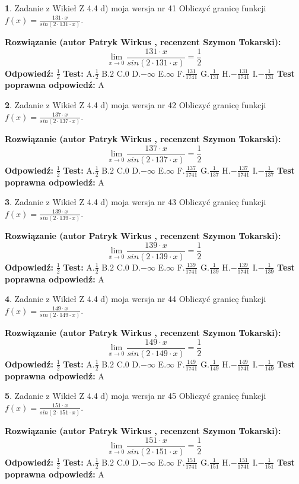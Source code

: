 \documentclass[12pt, a4paper]{article}
\theoremstyle{definition} %
\newtheorem{zad}{}
\newcommand{\zadStart}[1]{\begin{zad}#1\newline}
\newcommand{\zadStop}{\end{zad}}
\newcommand{\rozwStart}[2]{\noindent \textbf{Rozwiązanie (autor #1 , recenzent #2): }\newline}
\newcommand{\rozwStop}{\newline}
\newcommand{\odpStart}{\noindent \textbf{Odpowiedź:}\newline}
\newcommand{\odpStop}{\newline}
\newcommand{\testStart}{\noindent \textbf{Test:}\newline}
\newcommand{\testStop}{\newline}
\newcommand{\kluczStart}{\noindent \textbf{Test poprawna odpowiedź:}\newline}
\newcommand{\kluczStop}{\newline}
\begin{document}
\zadStart{Zadanie z Wikieł Z 4.4 d) moja wersja nr 41}
Obliczyć granicę funkcji $f(x)=\frac{131\cdot x}{sin(2 \cdot131\cdot x)}$.
\zadStop
\rozwStart{Patryk Wirkus}{Szymon Tokarski}
$$\lim\limits_{x\to 0}\frac{131\cdot x}{sin(2 \cdot131\cdot x)}=\frac{1}{2}$$
\rozwStop
\odpStart
$\frac{1}{2}$
\odpStop
\testStart
A.$\frac{1}{2}$
B.$2$
C.$0$
D.$-\infty$
E.$\infty$
F.$\frac{131}{1741}$
G.$\frac{1}{131}$
H.$-\frac{131}{1741}$
I.$-\frac{1}{131}$
\testStop
\kluczStart
A
\kluczStop



\zadStart{Zadanie z Wikieł Z 4.4 d) moja wersja nr 42}
Obliczyć granicę funkcji $f(x)=\frac{137\cdot x}{sin(2 \cdot137\cdot x)}$.
\zadStop
\rozwStart{Patryk Wirkus}{Szymon Tokarski}
$$\lim\limits_{x\to 0}\frac{137\cdot x}{sin(2 \cdot137\cdot x)}=\frac{1}{2}$$
\rozwStop
\odpStart
$\frac{1}{2}$
\odpStop
\testStart
A.$\frac{1}{2}$
B.$2$
C.$0$
D.$-\infty$
E.$\infty$
F.$\frac{137}{1741}$
G.$\frac{1}{137}$
H.$-\frac{137}{1741}$
I.$-\frac{1}{137}$
\testStop
\kluczStart
A
\kluczStop



\zadStart{Zadanie z Wikieł Z 4.4 d) moja wersja nr 43}
Obliczyć granicę funkcji $f(x)=\frac{139\cdot x}{sin(2 \cdot139\cdot x)}$.
\zadStop
\rozwStart{Patryk Wirkus}{Szymon Tokarski}
$$\lim\limits_{x\to 0}\frac{139\cdot x}{sin(2 \cdot139\cdot x)}=\frac{1}{2}$$
\rozwStop
\odpStart
$\frac{1}{2}$
\odpStop
\testStart
A.$\frac{1}{2}$
B.$2$
C.$0$
D.$-\infty$
E.$\infty$
F.$\frac{139}{1741}$
G.$\frac{1}{139}$
H.$-\frac{139}{1741}$
I.$-\frac{1}{139}$
\testStop
\kluczStart
A
\kluczStop



\zadStart{Zadanie z Wikieł Z 4.4 d) moja wersja nr 44}
Obliczyć granicę funkcji $f(x)=\frac{149\cdot x}{sin(2 \cdot149\cdot x)}$.
\zadStop
\rozwStart{Patryk Wirkus}{Szymon Tokarski}
$$\lim\limits_{x\to 0}\frac{149\cdot x}{sin(2 \cdot149\cdot x)}=\frac{1}{2}$$
\rozwStop
\odpStart
$\frac{1}{2}$
\odpStop
\testStart
A.$\frac{1}{2}$
B.$2$
C.$0$
D.$-\infty$
E.$\infty$
F.$\frac{149}{1741}$
G.$\frac{1}{149}$
H.$-\frac{149}{1741}$
I.$-\frac{1}{149}$
\testStop
\kluczStart
A
\kluczStop



\zadStart{Zadanie z Wikieł Z 4.4 d) moja wersja nr 45}
Obliczyć granicę funkcji $f(x)=\frac{151\cdot x}{sin(2 \cdot151\cdot x)}$.
\zadStop
\rozwStart{Patryk Wirkus}{Szymon Tokarski}
$$\lim\limits_{x\to 0}\frac{151\cdot x}{sin(2 \cdot151\cdot x)}=\frac{1}{2}$$
\rozwStop
\odpStart
$\frac{1}{2}$
\odpStop
\testStart
A.$\frac{1}{2}$
B.$2$
C.$0$
D.$-\infty$
E.$\infty$
F.$\frac{151}{1741}$
G.$\frac{1}{151}$
H.$-\frac{151}{1741}$
I.$-\frac{1}{151}$
\testStop
\kluczStart
A
\kluczStop
\end{document}
